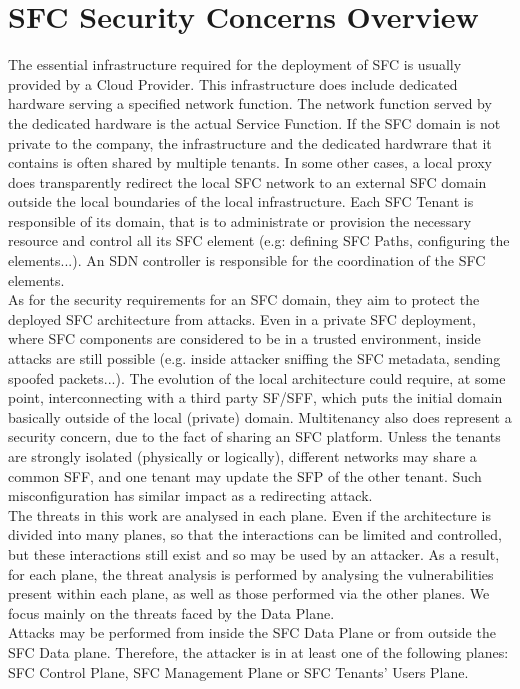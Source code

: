 \section{SFC Security Concerns Overview} 
The essential infrastructure required for the deployment of SFC is usually provided by a Cloud Provider. This infrastructure does include dedicated hardware serving a specified network function. The network function served by the dedicated hardware is the actual Service Function. If the SFC domain is not private to the company, the infrastructure and the dedicated hardwrare that it contains is often shared by multiple tenants. In some other cases, a local proxy does transparently redirect the local SFC network to an external SFC domain outside the local boundaries of the local infrastructure. Each SFC Tenant is responsible of its domain, that is to administrate or provision the necessary resource and control all its SFC element (e.g: defining SFC Paths, configuring the elements...). An SDN controller is responsible for the coordination of the SFC elements.\\
As for the security requirements for an SFC domain, they aim to protect the deployed SFC architecture from attacks. Even in a private SFC deployment, where SFC components are considered to be in a trusted environment, inside attacks are still possible (e.g. inside attacker sniffing the SFC metadata, sending spoofed packets...). The evolution of the local architecture could require, at some point, interconnecting with a third party SF/SFF, which puts the initial domain basically outside of the local (private) domain. Multitenancy also does represent a security concern, due to the fact of sharing an SFC platform. Unless the tenants are strongly isolated (physically or logically), different networks may share a common SFF, and one tenant may update the SFP of the other tenant. Such misconfiguration has similar impact as a redirecting attack.\\
The threats in this work are analysed in each plane. Even if the architecture is divided into many planes, so that the interactions can be limited and controlled, but these interactions still exist and so may be used by an attacker. As a result, for each plane, the threat analysis is performed by analysing the vulnerabilities present within each plane, as well as those performed via the other planes. We focus mainly on the threats faced by the Data Plane.\\
Attacks may be performed from inside the SFC Data Plane or from outside the SFC Data plane. Therefore, the attacker is in at least one of the following planes: SFC Control Plane, SFC Management Plane or SFC Tenants’ Users Plane.\\
